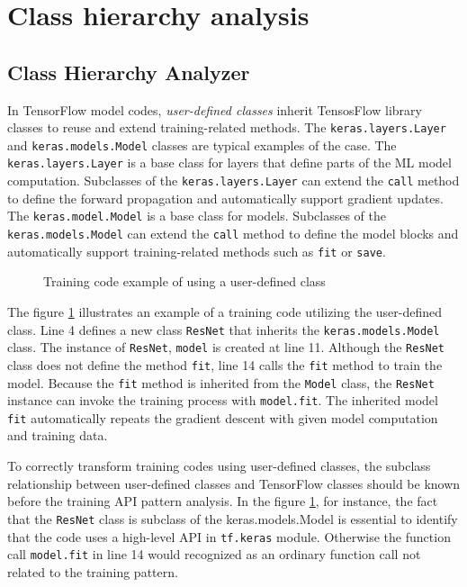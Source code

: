 \section{Class hierarchy analysis}\label{sec:cha}

\subsection{Class Hierarchy Analyzer}

In TensorFlow model codes, \textit{user-defined classes} inherit
TensosFlow library classes to reuse and extend training-related methods.
The {\tt keras.layers.Layer} and {\tt keras.models.Model} classes 
are typical examples of the case.
The {\tt keras.layers.Layer} is a base class for
layers that define parts of the ML model computation.
Subclasses of the {\tt keras.layers.Layer} can extend
the {\tt call} method to define the forward propagation
and automatically support gradient updates.
The {\tt keras.model.Model} is a base class for models.
Subclasses of the {\tt keras.models.Model} can extend
the {\tt call} method to define the model blocks
and automatically support training-related methods
such as {\tt fit} or {\tt save}. 

\begin{figure}[h]

\caption{Training code example of using a user-defined class}
\label{fig:cha:ex}
\end{figure}

The figure \ref{fig:cha:ex} illustrates an example of a training code
utilizing the user-defined class. 
Line 4 defines a new class {\tt ResNet} that inherits the  
{\tt keras.models.Model} class. The instance of {\tt ResNet}, {\tt model}
is created at line 11. Although the {\tt ResNet} class does not define
the method {\tt fit}, line 14 calls the {\tt fit} method to train the model.
Because the {\tt fit} method is inherited from the {\tt Model} class,
the {\tt ResNet} instance can invoke the training process with
{\tt model.fit}. The inherited model {\tt fit}
automatically repeats the gradient descent with
given model computation and training data. 

To correctly transform training codes using user-defined classes,
the subclass relationship between user-defined classes
and TensorFlow classes should be known before the training API pattern analysis. 
In the figure \ref{fig:cha:ex}, for instance, 
the fact that the {\tt ResNet} class
is subclass of the {keras.models.Model} is essential to identify
that the code uses a high-level API in {\tt tf.keras} module. 
Otherwise the function call {\tt model.fit} in line 14 would
recognized as an ordinary function call not related to the training pattern.

